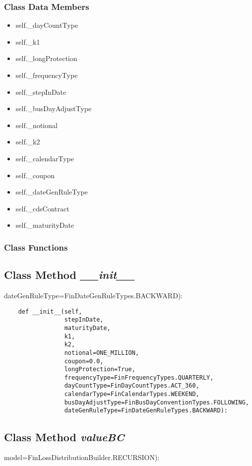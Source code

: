 \documentclass[twoside,11pt]{book}
\begin{document}
\subsubsection{Class Data Members}
\begin{itemize}
\item{self.\_dayCountType}
\item{self.\_k1}
\item{self.\_longProtection}
\item{self.\_frequencyType}
\item{self.\_stepInDate}
\item{self.\_busDayAdjustType}
\item{self.\_notional}
\item{self.\_k2}
\item{self.\_calendarType}
\item{self.\_coupon}
\item{self.\_dateGenRuleType}
\item{self.\_cdsContract}
\item{self.\_maturityDate}
\end{itemize}

\subsubsection{Class Functions}

\subsection{Class Method {\it \_\_init\_\_}}
dateGenRuleType=FinDateGenRuleTypes.BACKWARD):

\begin{lstlisting}
    def __init__(self,
                 stepInDate,
                 maturityDate,
                 k1,
                 k2,
                 notional=ONE_MILLION,
                 coupon=0.0,
                 longProtection=True,
                 frequencyType=FinFrequencyTypes.QUARTERLY,
                 dayCountType=FinDayCountTypes.ACT_360,
                 calendarType=FinCalendarTypes.WEEKEND,
                 busDayAdjustType=FinBusDayConventionTypes.FOLLOWING,
                 dateGenRuleType=FinDateGenRuleTypes.BACKWARD):
\end{lstlisting}

\subsection{Class Method {\it valueBC}}
model=FinLossDistributionBuilder.RECURSION):
\end{document}
